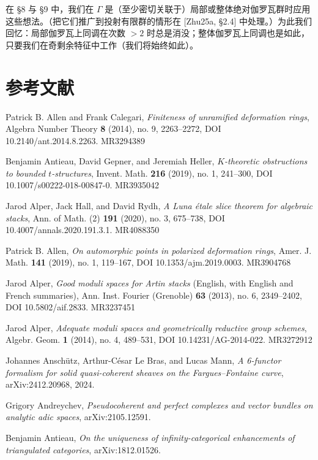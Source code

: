 在 §8 与 §9 中，我们在 $\Gamma$ 是（至少密切关联于）局部或整体绝对伽罗瓦群时应用这些想法。（把它们推广到投射有限群的情形在 [Zhu25a, §2.4] 中处理。）为此我们回忆：局部伽罗瓦上同调在次数 $>2$ 时总是消没；整体伽罗瓦上同调也是如此，只要我们在奇剩余特征中工作（我们将始终如此）。

\section*{参考文献}

\begin{refs}
\item[{[AC14]}] Patrick B. Allen and Frank Calegari, \emph{Finiteness of unramified deformation rings}, Algebra Number Theory \textbf{8} (2014), no. 9, 2263--2272, DOI 10.2140/ant.2014.8.2263. MR3294389
\item[{[AGH19]}] Benjamin Antieau, David Gepner, and Jeremiah Heller, \emph{$K$-theoretic obstructions to bounded $t$-structures}, Invent. Math. \textbf{216} (2019), no. 1, 241--300, DOI 10.1007/s00222-018-00847-0. MR3935042
\item[{[AHR20]}] Jarod Alper, Jack Hall, and David Rydh, \emph{A Luna \'etale slice theorem for algebraic stacks}, Ann. of Math. (2) \textbf{191} (2020), no. 3, 675--738, DOI 10.4007/annals.2020.191.3.1. MR4088350
\item[{[All19]}] Patrick B. Allen, \emph{On automorphic points in polarized deformation rings}, Amer. J. Math. \textbf{141} (2019), no. 1, 119--167, DOI 10.1353/ajm.2019.0003. MR3904768
\item[{[Alp13]}] Jarod Alper, \emph{Good moduli spaces for Artin stacks} (English, with English and French summaries), Ann. Inst. Fourier (Grenoble) \textbf{63} (2013), no. 6, 2349--2402, DOI 10.5802/aif.2833. MR3237451
\item[{[Alp14]}] Jarod Alper, \emph{Adequate moduli spaces and geometrically reductive group schemes}, Algebr. Geom. \textbf{1} (2014), no. 4, 489--531, DOI 10.14231/AG-2014-022. MR3272912
\item[{[ALBM24]}] Johannes Ansch\"utz, Arthur-C\'esar Le Bras, and Lucas Mann, \emph{A 6-functor formalism for solid quasi-coherent sheaves on the Fargues--Fontaine curve}, arXiv:2412.20968, 2024.
\item[{[And21]}] Grigory Andreychev, \emph{Pseudocoherent and perfect complexes and vector bundles on analytic adic spaces}, arXiv:2105.12591.
\item[{[Ant21]}] Benjamin Antieau, \emph{On the uniqueness of infinity-categorical enhancements of triangulated categories}, arXiv:1812.01526.

\end{refs}
